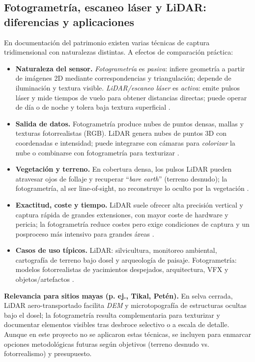 \subsection*{Fotogrametría, escaneo láser y LiDAR: diferencias y aplicaciones}

En documentación del patrimonio existen varias técnicas de captura tridimensional con naturalezas distintas. A efectos de comparación práctica:

\begin{itemize}
  \item \textbf{Naturaleza del sensor.} \emph{Fotogrametría} es \emph{pasiva}: infiere geometría a partir de imágenes 2D mediante correspondencias y triangulación; depende de iluminación y textura visible. \emph{LiDAR/escaneo láser} es \emph{activa}: emite pulsos láser y mide tiempos de vuelo para obtener distancias directas; puede operar de día o de noche y tolera baja textura superficial \cite{YellowScan2024,PropellerAeroLiDARvsPhoto}.
  \item \textbf{Salida de datos.} Fotogrametría produce nubes de puntos densas, mallas y texturas fotorrealistas (RGB). LiDAR genera nubes de puntos 3D con coordenadas e intensidad; puede integrarse con cámaras para \emph{colorizar} la nube o combinarse con fotogrametría para texturizar \cite{YellowScan2024,PropellerAeroLiDARvsPhoto}.
  \item \textbf{Vegetación y terreno.} En cobertura densa, los pulsos LiDAR pueden atravesar ojos de follaje y recuperar “\emph{bare earth}” (terreno desnudo); la fotogrametría, al ser line-of-sight, no reconstruye lo oculto por la vegetación \cite{YellowScan2024,PropellerAeroLiDARvsPhoto}.
  \item \textbf{Exactitud, coste y tiempo.} LiDAR suele ofrecer alta precisión vertical y captura rápida de grandes extensiones, con mayor coste de hardware y pericia; la fotogrametría reduce costes pero exige condiciones de captura y un posproceso más intensivo para grandes áreas \cite{YellowScan2024,PropellerAeroLiDARvsPhoto}.
  \item \textbf{Casos de uso típicos.} LiDAR: silvicultura, monitoreo ambiental, cartografía de terreno bajo dosel y arqueología de paisaje. Fotogrametría: modelos fotorrealistas de yacimientos despejados, arquitectura, VFX y objetos/artefactos \cite{YellowScan2024,PropellerAeroLiDARvsPhoto}.
\end{itemize}


\textbf{Relevancia para sitios mayas (p. ej., Tikal, Petén).} En selva cerrada, LiDAR aero-transportado facilita \emph{DEM} y microtopografía de estructuras ocultas bajo el dosel; la fotogrametría resulta complementaria para texturizar y documentar elementos visibles tras desbroce selectivo o a escala de detalle. Aunque en este proyecto no se aplicaron estas técnicas, se incluyen para enmarcar opciones metodológicas futuras según objetivos (terreno desnudo vs. fotorrealismo) y presupuesto.

